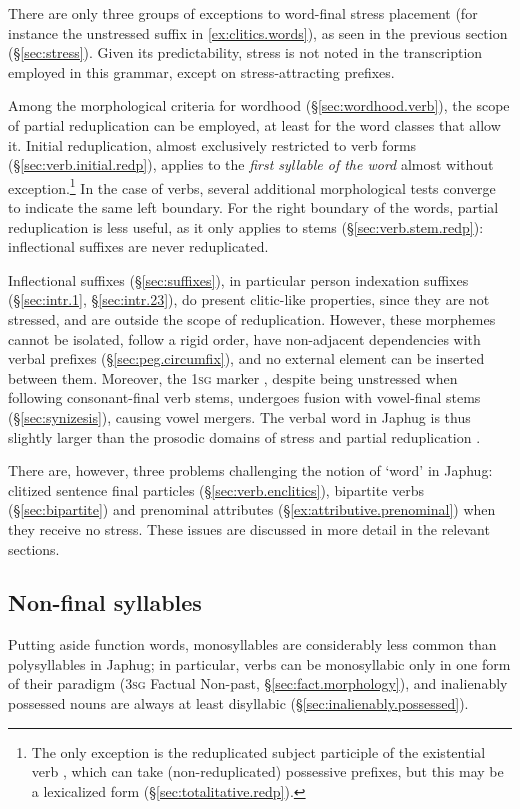 There are only three groups of exceptions to word-final stress placement (for instance the unstressed suffix  in \ref{ex:clitics.words}), as seen in the previous section (§\ref{sec:stress}). Given its predictability, stress is not noted in the transcription employed in this grammar, except on stress-attracting prefixes.

Among the morphological criteria for wordhood (§\ref{sec:wordhood.verb}), the scope of partial reduplication can be employed, at least for the word classes that allow it. Initial reduplication, almost exclusively restricted to verb forms (§\ref{sec:verb.initial.redp}), applies to the \textit{first syllable of the word} almost without exception.\footnote{The only exception is the reduplicated subject participle  of the existential verb , which can take (non-reduplicated) possessive prefixes, but this may be a lexicalized form (§\ref{sec:totalitative.redp}). }   In the case of verbs, several additional morphological tests converge to indicate the same left boundary. For the right boundary of the words, partial reduplication is less useful, as it only applies to stems (§\ref{sec:verb.stem.redp}): inflectional suffixes are never reduplicated.

Inflectional suffixes (§\ref{sec:suffixes}), in particular person indexation suffixes (§\ref{sec:intr.1}, §\ref{sec:intr.23}), do present clitic-like properties, since they are not stressed, and are outside the scope of reduplication. However, these morphemes cannot be isolated, follow a rigid order, have non-adjacent dependencies with verbal prefixes (§\ref{sec:peg.circumfix}), and no external element can be inserted between them. Moreover, the \textsc{1sg} marker , despite being unstressed when following consonant-final verb stems, undergoes fusion with vowel-final stems (§\ref{sec:synizesis}), causing vowel mergers. The verbal word in Japhug is thus slightly larger than the prosodic domains of stress and partial reduplication \citep{schiering10prosodic}.

There are, however, three problems challenging the notion of `word' in Japhug: clitized sentence final particles (§\ref{sec:verb.enclitics}), bipartite verbs (§\ref{sec:bipartite}) and  prenominal attributes (§\ref{ex:attributive.prenominal}) when they receive no stress. These issues are discussed in more detail in the relevant sections. 

\subsection{Non-final syllables} \label{sec:non.final.syllable}
Putting aside function words, monosyllables are considerably less common than polysyllables in Japhug; in particular, verbs can be monosyllabic only in one form of their paradigm (\textsc{3sg} Factual Non-past, §\ref{sec:fact.morphology}), and inalienably possessed nouns are always at least disyllabic (§\ref{sec:inalienably.possessed}).

